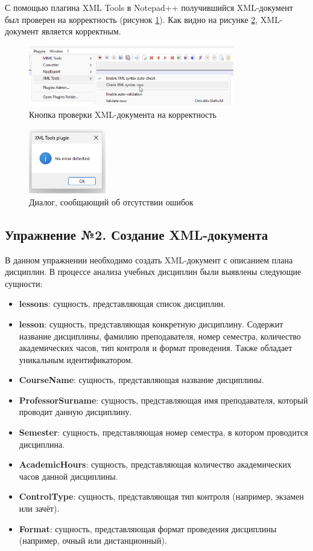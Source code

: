 \documentclass[a4paper, 14pt]{extarticle}
\begin{document}
С помощью плагина XML Tools в Notepad++ получившийся XML-документ был
проверен на корректность (рисунок \ref{fig:task-1:2}). Как видно на рисунке
\ref{fig:task-1:3}, XML-документ является корректным.

\begin{figure}[H]
  \centering
  \includegraphics[width=0.8\textwidth]{images/task-1/2.png}
  \caption{Кнопка проверки XML-документа на корректность}
  \label{fig:task-1:2}
\end{figure}

\begin{figure}[H]
  \centering
  \includegraphics[width=0.3\textwidth]{images/task-1/3.png}
  \caption{Диалог, сообщающий об отсутствии ошибок}
  \label{fig:task-1:3}
\end{figure}

\subsection*{Упражнение №2. Создание XML-документа}

В данном упражнении необходимо создать XML-документ с описанием плана дисциплин.
В процессе анализа учебных дисциплин были выявлены следующие сущности:
\begin{itemize}
  \item \textbf{lessons}: сущность, представляющая список дисциплин.
  \item \textbf{lesson}: сущность, представляющая конкретную дисциплину.
  Содержит название дисциплины, фамилию преподавателя, номер семестра,
  количество академических часов, тип контроля и формат проведения. Также
  обладает уникальным идентификатором.
  \item \textbf{CourseName}: сущность, представляющая название дисциплины.
  \item \textbf{ProfessorSurname}: сущность, представляющая имя преподавателя,
  который проводит данную дисциплину.
  \item \textbf{Semester}: сущность, представляющая номер семестра, в котором
  проводится дисциплина.
  \item \textbf{AcademicHours}: сущность, представляющая количество
  академических часов данной дисциплины.
  \item \textbf{ControlType}: сущность, представляющая тип контроля (например,
  экзамен или зачёт).
  \item \textbf{Format}: сущность, представляющая формат проведения дисциплины
  (например, очный или дистанционный).
\end{itemize}
\end{document}
